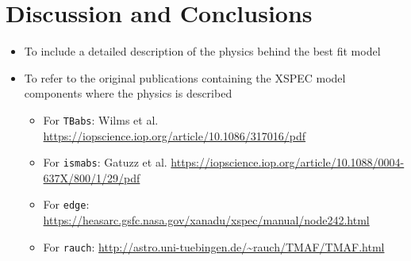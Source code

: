 \section{Discussion and Conclusions}
    \begin{itemize}
        \item To include a detailed description of the physics behind the best fit model
        \item To refer to the original publications containing the XSPEC model components where the physics is described
        \begin{itemize}
            \item For \texttt{TBabs}: Wilms et al. \url{https://iopscience.iop.org/article/10.1086/317016/pdf}
            \item For \texttt{ismabs}: Gatuzz et al. \url{https://iopscience.iop.org/article/10.1088/0004-637X/800/1/29/pdf}
            \item For \texttt{edge}: \url{https://heasarc.gsfc.nasa.gov/xanadu/xspec/manual/node242.html}
            \item For \texttt{rauch}: \url{http://astro.uni-tuebingen.de/~rauch/TMAF/TMAF.html}
        \end{itemize}
    \end{itemize}
